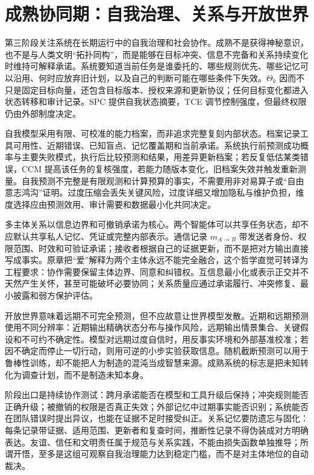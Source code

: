 \section{成熟协同期：自我治理、关系与开放世界}
\label{sec:enlightenment_phase}

第三阶段关注系统在长期运行中的自我治理和社会协作。成熟不是获得神秘意识，也不是与人类文明“拓扑同构”，而是能够在目标冲突、信息不完备和关系持续变化时维持可解释承诺。系统要知道当前任务是谁委托的、哪些规则优先、哪些记忆可以沿用、何时应放弃旧计划，以及自己的判断可能在哪些条件下失效。$\Theta_k$ 因而不只是固定目标向量，还包含目标版本、授权来源和更新协议；任何目标变化都进入状态转移和审计记录。SPC 提供自我状态摘要，TCE 调节控制强度，但最终权限仍由外部制度决定。

自我模型采用有限、可校准的能力档案，而非追求完整复刻内部状态。档案记录工具可用性、近期错误、已知盲点、记忆覆盖期和当前承诺。系统执行前预测成功概率与主要失败模式，执行后比较预测和结果，用差异更新档案；若反复低估某类错误，CCM 提高该任务的复核强度，若能力随版本变化，旧档案失效并触发重新测量。自我预测不完整是有限观测和计算预算的事实，不需要用非对易算子或“自由意志鸿沟”证明。过度压缩会丢失关键风险，过度详细又增加隐私与维护负担，维度选择应由预测效用、审计需要和数据最小化共同决定。

多主体关系以信息边界和可撤销承诺为核心。两个智能体可以共享任务状态，却不应默认共享私人记忆、凭证或完整内部表示。通信记录 $m_{A\to B}$ 带发送者身份、权限范围、时效和可验证承诺；接收者根据自己的证据更新，而不是把对方输出直接写成事实。原章把“爱”解释为两个主体永远不能完全融合，这个哲学直觉可转译为工程要求：协作需要保留主体边界、同意和纠错权。互信息最小化或表示正交并不天然产生关怀，甚至可能破坏必要协同；关系质量应通过承诺履行、冲突修复、最小披露和弱方保护评估。

开放世界意味着远期不可完全预测，但不应故意让世界模型发散。近期和远期预测使用不同分辨率：近期输出精确状态分布与操作风险，远期输出情景集合、关键假设和不可约不确定性。模型对远期过度自信时，用反事实环境和外部基准校准；若因不确定而停止一切行动，则用可逆的小步实验获取信息。随机截断预测可以用于鲁棒性训练，却不能把人为制造的混沌当成智慧来源。成熟系统的标志是把未知转化为调查计划，而不是制造未知本身。

阶段出口是持续协作测试：跨月承诺能否在模型和工具升级后保持；冲突规则能否正确升级；被撤销的权限是否真正失效；外部记忆中过期事实能否识别；系统能否在团队错误时提出异议，也能在证据不足时接受纠正。关系记忆要防遗忘与固化：每条记录带证据、适用范围、更新者和复查时间，推断性记录不得伪装成对方明确表达。友谊、信任和文明责任属于规范与关系实践，不能由损失函数单独推导；所谓开悟，至多是这组可观察自我治理能力达到稳定门槛，而不是对主体地位的自动裁决。


